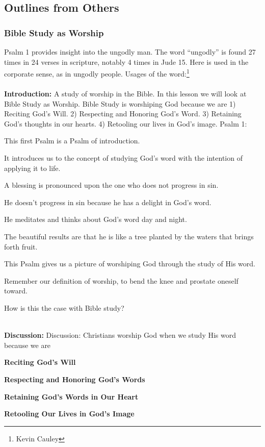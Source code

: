 \subsection{Outlines from Others}

\subsubsection{Bible Study as Worship}
Psalm 1 provides insight into the ungodly man. The word ``ungodly'' is found 27 times in 24 verses in scripture, notably 4 times in Jude 15. Here is used in the corporate sense, as in ungodly people. Usages of the word:\footnote{Kevin Cauley}\\ \\
\noindent \textbf{Introduction: }A study of worship in the Bible. In this lesson we will look at Bible Study as Worship. Bible Study is worshiping God because we are 1) Reciting God's Will. 2) Respecting and Honoring God's Word. 3) Retaining God's thoughts in our hearts. 4) Retooling our lives in God's image.  Psalm 1:
\begin{compactenum}[1.][9]
	\item This first Psalm is a Psalm of introduction.
	\item It introduces us to the concept of studying God's word with the intention of applying it to life.
	\item A blessing is pronounced upon the one who does not progress in sin.
	\item He doesn't progress in sin because he has a delight in God's word.
	\item He meditates and thinks about God's word day and night.
	\item The beautiful results are that he is like a tree planted by the waters that brings forth fruit.
	\item This Psalm gives us a picture of worshiping God through the study of His word.
	\item Remember our definition of worship, to bend the knee and prostate oneself toward.
	\item How is this the case with Bible study?
\end{compactenum}
\textbf{\\Discussion: }Discussion: Christians worship God when we study His word because we are
\begin{compactenum}[I.][8]
	\item \textbf{Reciting God's Will} 
	\item  \textbf{Respecting and Honoring God's Words} 
	\item  \textbf{Retaining God's Words in Our Heart} 
	\item  \textbf{Retooling Our Lives in God's Image} 
\end{compactenum}

